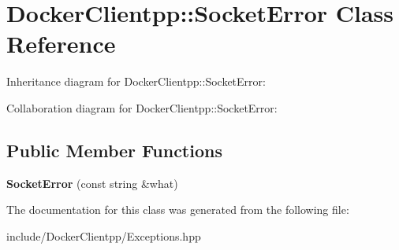 \hypertarget{classDockerClientpp_1_1SocketError}{}\section{Docker\+Clientpp\+::Socket\+Error Class Reference}
\label{classDockerClientpp_1_1SocketError}


Inheritance diagram for Docker\+Clientpp\+::Socket\+Error\+:


Collaboration diagram for Docker\+Clientpp\+::Socket\+Error\+:
\subsection*{Public Member Functions}
\begin{DoxyCompactItemize}
\item 
\mbox{\label{classDockerClientpp_1_1SocketError_a15cff70c0bbd4fdc04aabb21e03b6194}} 
{\bfseries Socket\+Error} (const string \&what)
\end{DoxyCompactItemize}


The documentation for this class was generated from the following file\+:\begin{DoxyCompactItemize}
\item 
include/\+Docker\+Clientpp/Exceptions.\+hpp\end{DoxyCompactItemize}
